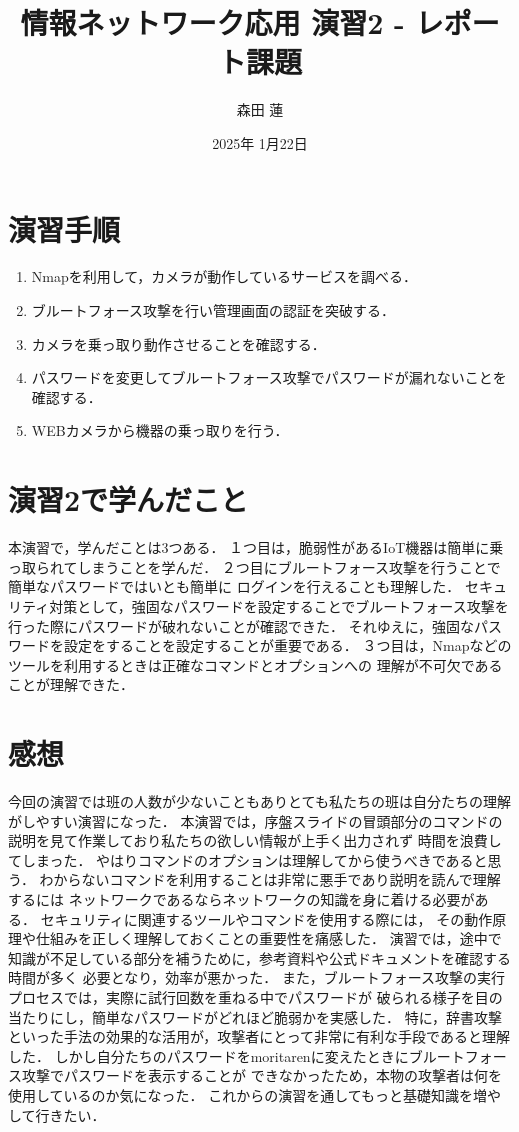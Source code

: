 \documentclass{jlreq}
\title{情報ネットワーク応用 演習2 - レポート課題}
\author{森田 蓮}
\date{2025年 1月22日}
\begin{document}
\maketitle

\section{演習手順}
\begin{enumerate}
    \item Nmapを利用して，カメラが動作しているサービスを調べる．
    \item ブルートフォース攻撃を行い管理画面の認証を突破する．
    \item カメラを乗っ取り動作させることを確認する．
    \item パスワードを変更してブルートフォース攻撃でパスワードが漏れないことを確認する．
    \item WEBカメラから機器の乗っ取りを行う．
\end{enumerate}

\section{演習2で学んだこと}
本演習で，学んだことは3つある．
１つ目は，脆弱性があるIoT機器は簡単に乗っ取られてしまうことを学んだ．
２つ目にブルートフォース攻撃を行うことで簡単なパスワードではいとも簡単に
ログインを行えることも理解した．
セキュリティ対策として，強固なパスワードを設定することでブルートフォース攻撃を
行った際にパスワードが破れないことが確認できた．
それゆえに，強固なパスワードを設定をすることを設定することが重要である．
３つ目は，Nmapなどのツールを利用するときは正確なコマンドとオプションへの
理解が不可欠であることが理解できた．

\section{感想}
今回の演習では班の人数が少ないこともありとても私たちの班は自分たちの理解がしやすい演習になった．
本演習では，序盤スライドの冒頭部分のコマンドの説明を見て作業しており私たちの欲しい情報が上手く出力されず
時間を浪費してしまった．
やはりコマンドのオプションは理解してから使うべきであると思う．
わからないコマンドを利用することは非常に悪手であり説明を読んで理解するには
ネットワークであるならネットワークの知識を身に着ける必要がある．
セキュリティに関連するツールやコマンドを使用する際には，
その動作原理や仕組みを正しく理解しておくことの重要性を痛感した．
演習では，途中で知識が不足している部分を補うために，参考資料や公式ドキュメントを確認する時間が多く
必要となり，効率が悪かった．
また，ブルートフォース攻撃の実行プロセスでは，実際に試行回数を重ねる中でパスワードが
破られる様子を目の当たりにし，簡単なパスワードがどれほど脆弱かを実感した．
特に，辞書攻撃といった手法の効果的な活用が，攻撃者にとって非常に有利な手段であると理解した．
しかし自分たちのパスワードをmoritarenに変えたときにブルートフォース攻撃でパスワードを表示することが
できなかったため，本物の攻撃者は何を使用しているのか気になった．
これからの演習を通してもっと基礎知識を増やして行きたい．
\end{document}
